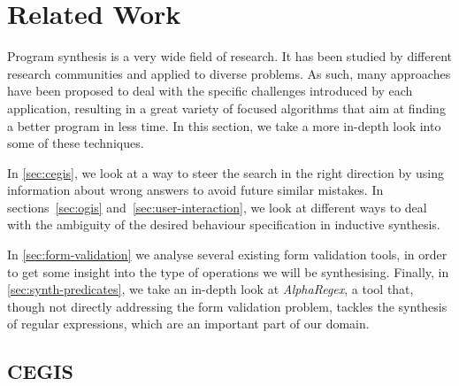 \chapter{Related Work}\label{sec:related-work}

Program synthesis is a very wide field of research. It has been studied by different research communities and applied to diverse problems. As such, many approaches have been proposed to deal with the specific challenges introduced by each application, resulting in a great variety of focused algorithms that aim at finding a better program in less time. In this section, we take a more in-depth look into some of these techniques.

In \autoref{sec:cegis}, we look at a way to steer the search in the right direction by using information about wrong answers to avoid future similar mistakes. In sections~\ref{sec:ogis} and~\ref{sec:user-interaction}, we look at different ways to deal with the ambiguity of the desired behaviour specification in inductive synthesis.

In \autoref{sec:form-validation} we analyse several existing form validation tools, in order to get some insight into the type of operations we will be synthesising. Finally, in \autoref{sec:synth-predicates}, we take an in-depth look at \textit{AlphaRegex}, a tool that, though not directly addressing the form validation problem, tackles the synthesis of regular expressions, which are an important part of our domain.

\section{\acl{CEGIS}}\label{sec:cegis}


